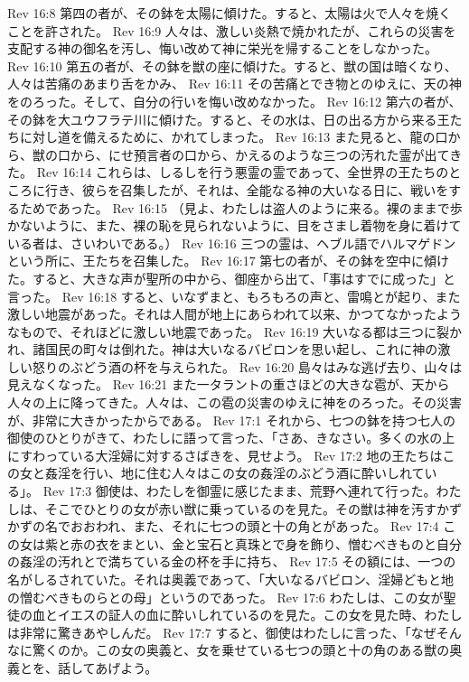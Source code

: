 Rev 16:8  第四の者が、その鉢を太陽に傾けた。すると、太陽は火で人々を焼くことを許された。
Rev 16:9  人々は、激しい炎熱で焼かれたが、これらの災害を支配する神の御名を汚し、悔い改めて神に栄光を帰することをしなかった。
Rev 16:10  第五の者が、その鉢を獣の座に傾けた。すると、獣の国は暗くなり、人々は苦痛のあまり舌をかみ、
Rev 16:11  その苦痛とでき物とのゆえに、天の神をのろった。そして、自分の行いを悔い改めなかった。
Rev 16:12  第六の者が、その鉢を大ユウフラテ川に傾けた。すると、その水は、日の出る方から来る王たちに対し道を備えるために、かれてしまった。
Rev 16:13  また見ると、龍の口から、獣の口から、にせ預言者の口から、かえるのような三つの汚れた霊が出てきた。
Rev 16:14  これらは、しるしを行う悪霊の霊であって、全世界の王たちのところに行き、彼らを召集したが、それは、全能なる神の大いなる日に、戦いをするためであった。
Rev 16:15  （見よ、わたしは盗人のように来る。裸のままで歩かないように、また、裸の恥を見られないように、目をさまし着物を身に着けている者は、さいわいである。）
Rev 16:16  三つの霊は、ヘブル語でハルマゲドンという所に、王たちを召集した。
Rev 16:17  第七の者が、その鉢を空中に傾けた。すると、大きな声が聖所の中から、御座から出て、「事はすでに成った」と言った。
Rev 16:18  すると、いなずまと、もろもろの声と、雷鳴とが起り、また激しい地震があった。それは人間が地上にあらわれて以来、かつてなかったようなもので、それほどに激しい地震であった。
Rev 16:19  大いなる都は三つに裂かれ、諸国民の町々は倒れた。神は大いなるバビロンを思い起し、これに神の激しい怒りのぶどう酒の杯を与えられた。
Rev 16:20  島々はみな逃げ去り、山々は見えなくなった。
Rev 16:21  また一タラントの重さほどの大きな雹が、天から人々の上に降ってきた。人々は、この雹の災害のゆえに神をのろった。その災害が、非常に大きかったからである。
Rev 17:1  それから、七つの鉢を持つ七人の御使のひとりがきて、わたしに語って言った、「さあ、きなさい。多くの水の上にすわっている大淫婦に対するさばきを、見せよう。
Rev 17:2  地の王たちはこの女と姦淫を行い、地に住む人々はこの女の姦淫のぶどう酒に酔いしれている」。
Rev 17:3  御使は、わたしを御霊に感じたまま、荒野へ連れて行った。わたしは、そこでひとりの女が赤い獣に乗っているのを見た。その獣は神を汚すかずかずの名でおおわれ、また、それに七つの頭と十の角とがあった。
Rev 17:4  この女は紫と赤の衣をまとい、金と宝石と真珠とで身を飾り、憎むべきものと自分の姦淫の汚れとで満ちている金の杯を手に持ち、
Rev 17:5  その額には、一つの名がしるされていた。それは奥義であって、「大いなるバビロン、淫婦どもと地の憎むべきものらとの母」というのであった。
Rev 17:6  わたしは、この女が聖徒の血とイエスの証人の血に酔いしれているのを見た。この女を見た時、わたしは非常に驚きあやしんだ。
Rev 17:7  すると、御使はわたしに言った、「なぜそんなに驚くのか。この女の奥義と、女を乗せている七つの頭と十の角のある獣の奥義とを、話してあげよう。
